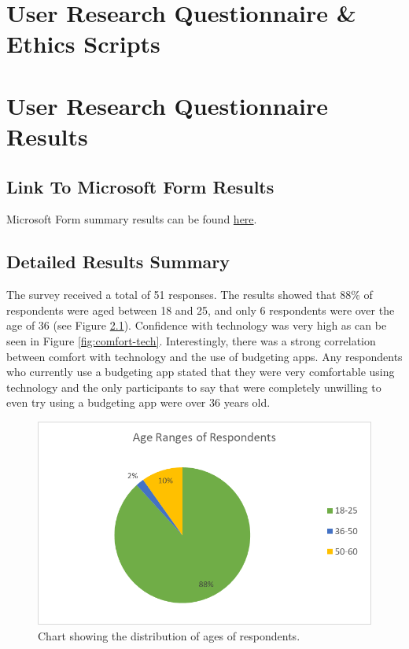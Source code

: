\documentclass{l4proj}
\begin{document}
\begin{appendices}
\chapter{User Research Questionnaire \& Ethics Scripts}
\label{app:user-survey}


\chapter{User Research Questionnaire Results}
\label{app:user-survey-results}
\section{Link To Microsoft Form Results}
Microsoft Form summary results can be found \href{https://forms.office.com/Pages/AnalysisPage.aspx?AnalyzerToken=KkePlypYV4CgKDFyU41zF1OEeqhQEk9q&id=KVxybjp2UE-B8i4lTwEzyLzaCqY070xHgthppmcrVEpUMzZLU0NSUDlKTkpITFA4NUVLWFc5Q000RC4u}{here}. 

\section{Detailed Results Summary}
The survey received a total of 51 responses. The results showed that 88\% of respondents were aged between 18 and 25, and only 6 respondents were over the age of 36 (see Figure \ref{fig:age-ranges}). Confidence with technology was very high as can be seen in Figure \ref{fig:comfort-tech}. Interestingly, there was a strong correlation between comfort with technology and the use of budgeting apps. Any respondents who currently use a budgeting app stated that they were very comfortable using technology and the only participants to say that were completely unwilling to even try using a budgeting app were over 36 years old.

\begin{figure}
    \centering
    \includegraphics[width=0.5\linewidth]{images/User-Survey/user-survey-charts-age-range.png}
    \caption{Chart showing the distribution of ages of respondents.}
    \label{fig:age-ranges}
\end{figure}


\end{appendices}
\end{document}
